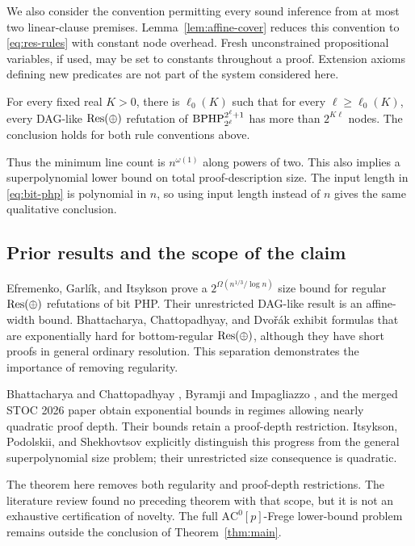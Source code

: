 We also consider the convention permitting every sound inference from at
most two linear-clause premises. Lemma~\ref{lem:affine-cover} reduces this
convention to \eqref{eq:res-rules} with constant node overhead.
Fresh unconstrained propositional variables, if used, may be set to
constants throughout a proof. Extension axioms defining new predicates
are not part of the system considered here.

\begin{theorem}\label{thm:main}
For every fixed real \(K>0\), there is \(\ell_0(K)\) such that for every
\(\ell\ge\ell_0(K)\), every DAG-like \(\mathrm{Res}(\oplus)\) refutation of
\(\mathrm{BPHP}_{2^\ell}^{2^\ell+1}\) has more than \(2^{K\ell}\) nodes.
The conclusion holds for both rule conventions above.
\end{theorem}

Thus the minimum line count is \(n^{\omega(1)}\) along powers of two.
This also implies a superpolynomial lower bound on total proof-description
size. The input length in \eqref{eq:bit-php} is polynomial in \(n\), so
using input length instead of \(n\) gives the same qualitative conclusion.

\subsection{Prior results and the scope of the claim}
Efremenko, Garl\'ik, and Itsykson \cite{EGI25} prove a
\(2^{\Omega(n^{1/3}/\log n)}\) size bound for regular \(\mathrm{Res}(\oplus)\) refutations
of bit PHP. Their unrestricted DAG-like result is an affine-width bound.
Bhattacharya, Chattopadhyay, and Dvo\v{r}\'ak \cite{BCD24} exhibit formulas
that are exponentially hard for bottom-regular \(\mathrm{Res}(\oplus)\), although they
have short proofs in general ordinary resolution. This separation
demonstrates the importance of removing regularity.

Bhattacharya and Chattopadhyay \cite{BC25}, Byramji and Impagliazzo
\cite{BI25}, and the merged STOC 2026 paper \cite{BCBI26} obtain
exponential bounds in regimes allowing nearly quadratic proof depth.
Their bounds retain a proof-depth restriction. Itsykson, Podolskii,
and Shekhovtsov \cite{IPS26} explicitly distinguish this progress from
the general superpolynomial size problem; their unrestricted size
consequence is quadratic.

The theorem here removes both regularity and proof-depth
restrictions. The literature review found no preceding theorem with that
scope, but it is not an exhaustive certification of novelty.
The full \(\mathrm{AC}^0[p]\)-Frege lower-bound problem remains outside
the conclusion of Theorem~\ref{thm:main}.

